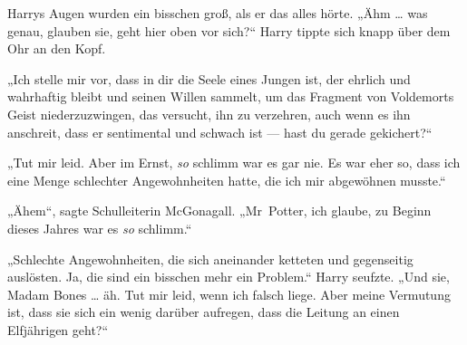 Harrys Augen wurden ein bisschen groß, als er das alles hörte.
„Ähm … was genau, glauben sie, geht hier oben vor sich?“
Harry tippte sich knapp über dem Ohr an den Kopf.

„Ich stelle mir vor, dass in dir die Seele eines Jungen ist, der ehrlich und wahrhaftig bleibt und seinen Willen sammelt, um das Fragment von Voldemorts Geist niederzuzwingen, das versucht, ihn zu verzehren, auch wenn es ihn anschreit, dass er sentimental und schwach ist — hast du gerade gekichert?“

„Tut mir leid. Aber im Ernst, \emph{so} schlimm war es gar nie. Es war eher so, dass ich eine Menge schlechter Angewohnheiten hatte, die ich mir abgewöhnen musste.“

„Ähem“, sagte Schulleiterin McGonagall.
„Mr~Potter, ich glaube, zu Beginn dieses Jahres war es \emph{so} schlimm.“

„Schlechte Angewohnheiten, die sich aneinander ketteten und gegenseitig auslösten. Ja, die sind ein bisschen mehr ein Problem.“ Harry seufzte.
„Und sie, Madam Bones … äh. Tut mir leid, wenn ich falsch liege. Aber meine Vermutung ist, dass sie sich ein wenig darüber aufregen, dass die Leitung an einen Elfjährigen geht?“

